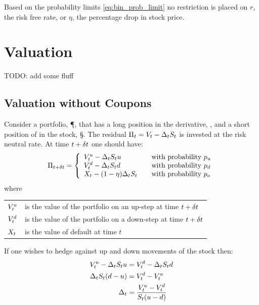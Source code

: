 \documentclass[a4paper,11pt,oneside]{report}
\theoremstyle{plain}
\theoremstyle{definition}
\begin{document}
Based on the probability limits \eqref{eq:bin_prob_limit} no restriction is placed on $r$, the risk free rate, or $\eta$, the percentage drop in stock price.


\section{Valuation}
TODO: add some fluff

\subsection{Valuation without Coupons}
Consider a portfolio, \P, that has a long position in the derivative, \V, and a short position of \D in the stock, \S.  The residual $\Pi_t = V_t - \Delta_tS_t$ is invested at the risk neutral rate.  At time $t + \delta t$ one should have:
\begin{equation*}
 \PDt =
 \left\{\begin{array}{l@{\qquad\text{with probability }}l}
  \Vu - \D\S u          & \pu \\
  \Vd - \D\S d          & \pd \\
  \X - (1 - \eta)\D\S   & \po \\
 \end{array}\right.
\end{equation*}
where

\begin{tabular}{ll}
 $V^{u}_t$          & is the value of the portfolio on an up-step at time $t + \delta t$ \\
 $V^{d}_t$          & is the value of the portfolio on a down-step at time $t + \delta t$ \\
 $X_t$           & is the value of default at time $t$ \\
\end{tabular}

If one wishes to hedge against up and down movements of the stock then:
\begin{align}
    V^{u}_t - \Delta_tS_t u &= V^{d}_t - \Delta_tS_t d \nonumber\\
     \Delta_tS_t(d - u) &= V^{d}_t - V^{u}_t \nonumber\\
              \Delta_t &= \frac{V^{u}_t - V^{d}_t}{S_t(u - d)}
\end{align}
\end{document}
